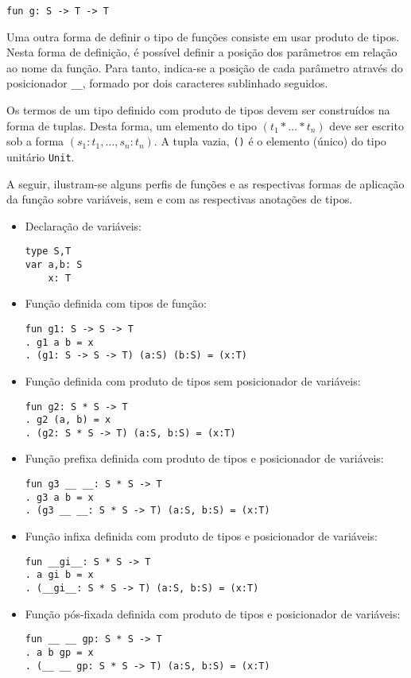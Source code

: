 \begin{Verbatim}
fun g: S -> T -> T
\end{Verbatim}

Uma outra forma de definir o tipo de funções consiste em usar produto de tipos.
Nesta forma de definição, é possível definir a posição dos parâmetros em relação ao nome da função.
Para tanto, indica-se a posição de cada parâmetro através do posicionador \Verb.__., formado por dois caracteres sublinhado seguidos.

Os termos de um tipo definido com produto de tipos devem ser construídos na forma de tuplas.
Desta forma, um elemento do tipo $(t_{1} * \ldots * t_{n})$ deve ser escrito sob a forma $(s_{1}: t_{1}, \ldots, s_{n}: t_{n})$.
A tupla vazia, \Verb.(). é o elemento (único) do tipo unitário \Verb.Unit..

A seguir, ilustram-se alguns perfis de funções e as respectivas formas de aplicação da função sobre variáveis, sem e com as respectivas anotações de tipos.
\begin{itemize}

\item Declaração de variáveis:
\begin{Verbatim}
type S,T
var a,b: S
    x: T
\end{Verbatim}

\item Função definida com tipos de função:
\begin{Verbatim}
fun g1: S -> S -> T
. g1 a b = x
. (g1: S -> S -> T) (a:S) (b:S) = (x:T)
\end{Verbatim}

\item Função definida com produto de tipos sem posicionador de variáveis:
\begin{Verbatim}
fun g2: S * S -> T
. g2 (a, b) = x
. (g2: S * S -> T) (a:S, b:S) = (x:T)
\end{Verbatim}

\item Função prefixa definida com produto de tipos e posicionador de variáveis:
\begin{Verbatim}
fun g3 __ __: S * S -> T
. g3 a b = x
. (g3 __ __: S * S -> T) (a:S, b:S) = (x:T)
\end{Verbatim}

\item Função infixa definida com produto de tipos e posicionador de variáveis:
\begin{Verbatim}
fun __gi__: S * S -> T
. a gi b = x
. (__gi__: S * S -> T) (a:S, b:S) = (x:T)
\end{Verbatim}

\item Função pós-fixada definida com produto de tipos e posicionador de variáveis:
\begin{Verbatim}
fun __ __ gp: S * S -> T
. a b gp = x
. (__ __ gp: S * S -> T) (a:S, b:S) = (x:T)
\end{Verbatim}

\end{itemize}

